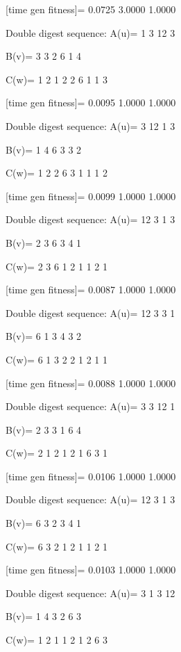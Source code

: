 [time gen fitness]=
    0.0725    3.0000    1.0000

Double digest sequence:
A(u)=
     1     3    12     3

B(v)=
     3     3     2     6     1     4

C(w)=
     1     2     1     2     2     6     1     1     3

[time gen fitness]=
    0.0095    1.0000    1.0000

Double digest sequence:
A(u)=
     3    12     1     3

B(v)=
     1     4     6     3     3     2

C(w)=
     1     2     2     6     3     1     1     1     2

[time gen fitness]=
    0.0099    1.0000    1.0000

Double digest sequence:
A(u)=
    12     3     1     3

B(v)=
     2     3     6     3     4     1

C(w)=
     2     3     6     1     2     1     1     2     1

[time gen fitness]=
    0.0087    1.0000    1.0000

Double digest sequence:
A(u)=
    12     3     3     1

B(v)=
     6     1     3     4     3     2

C(w)=
     6     1     3     2     2     1     2     1     1

[time gen fitness]=
    0.0088    1.0000    1.0000

Double digest sequence:
A(u)=
     3     3    12     1

B(v)=
     2     3     3     1     6     4

C(w)=
     2     1     2     1     2     1     6     3     1

[time gen fitness]=
    0.0106    1.0000    1.0000

Double digest sequence:
A(u)=
    12     3     1     3

B(v)=
     6     3     2     3     4     1

C(w)=
     6     3     2     1     2     1     1     2     1

[time gen fitness]=
    0.0103    1.0000    1.0000

Double digest sequence:
A(u)=
     3     1     3    12

B(v)=
     1     4     3     2     6     3

C(w)=
     1     2     1     1     2     1     2     6     3

